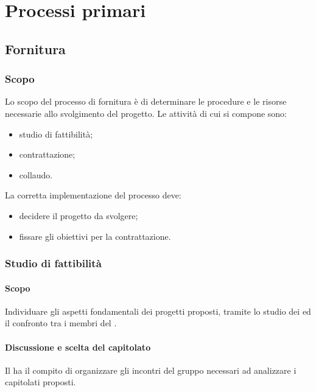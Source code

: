 \section{Processi primari}
    \subsection{Fornitura}
        \subsubsection{Scopo}
        Lo scopo del processo di fornitura è di determinare le procedure e le risorse necessarie allo svolgimento del progetto. Le attività di cui si compone sono:
        \begin{itemize}
            \item studio di fattibilità;
            \item contrattazione;
            \item collaudo.
        \end{itemize}
        La corretta implementazione del processo deve:
        \begin{itemize}
            \item decidere il progetto da svolgere;
            \item fissare gli obiettivi per la contrattazione.
        \end{itemize}
        \subsubsection{Studio di fattibilità}
            \paragraph{Scopo}
            Individuare gli aspetti fondamentali dei progetti proposti, tramite lo studio dei  ed il confronto tra i membri del .
            \paragraph{Discussione e scelta del capitolato}
            Il \responsabilediprogetto{} ha il compito di organizzare gli incontri del gruppo necessari ad analizzare i capitolati proposti.
